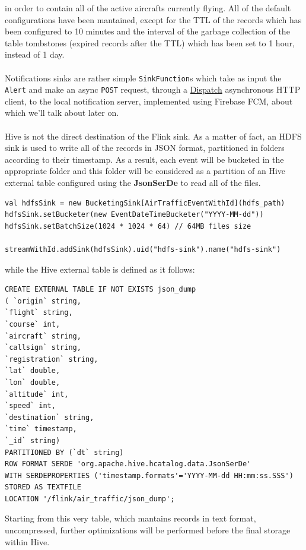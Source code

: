 in order to contain all of the active aircrafts currently flying. All of the default configurations have been mantained, except for the TTL of the records which has been configured to 10 minutes and the interval of the garbage collection of the table tombstones (expired records after the TTL) which has been set to 1 hour, instead of 1 day.
\\\\
Notifications sinks are rather simple \texttt{SinkFunction}s which take as input the \texttt{Alert} and make an async \texttt{POST} request, through a \href{https://dispatchhttp.org/Dispatch.html}{Dispatch} asynchronous HTTP client, to the local notification server, implemented using Firebase FCM, about which we'll talk about later on.
\\\\
Hive is not the direct destination of the Flink sink. As a matter of fact, an HDFS sink is used to write all of the records in JSON format, partitioned in folders according to their timestamp. As a result, each event will be bucketed in the appropriate folder and this folder will be considered as a partition of an Hive external table configured using the \textbf{JsonSerDe} to read all of the files.

\begin{verbatim}
val hdfsSink = new BucketingSink[AirTrafficEventWithId](hdfs_path)
hdfsSink.setBucketer(new EventDateTimeBucketer("YYYY-MM-dd"))
hdfsSink.setBatchSize(1024 * 1024 * 64) // 64MB files size

streamWithId.addSink(hdfsSink).uid("hdfs-sink").name("hdfs-sink")
\end{verbatim}

while the Hive external table is defined as it follows:

\begin{verbatim}
CREATE EXTERNAL TABLE IF NOT EXISTS json_dump
( `origin` string,
`flight` string,
`course` int,
`aircraft` string,
`callsign` string,
`registration` string,
`lat` double,
`lon` double,
`altitude` int,
`speed` int,
`destination` string,
`time` timestamp,
`_id` string)
PARTITIONED BY (`dt` string)
ROW FORMAT SERDE 'org.apache.hive.hcatalog.data.JsonSerDe'
WITH SERDEPROPERTIES ('timestamp.formats'='YYYY-MM-dd HH:mm:ss.SSS')
STORED AS TEXTFILE
LOCATION '/flink/air_traffic/json_dump';
\end{verbatim}

Starting from this very table, which mantains records in text format, uncompressed, further optimizations will be performed before the final storage within Hive.

